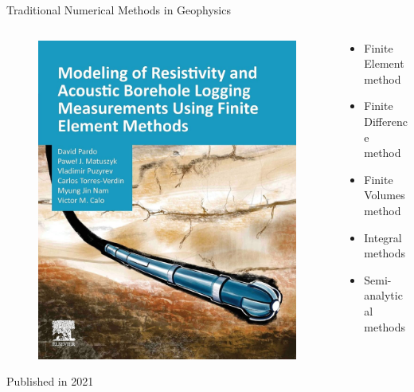 \begin{frame}{Traditional Numerical Methods in Geophysics}
\begin{columns}
\begin{column}{0.5\textwidth}
	\begin{figure}
	\includegraphics[scale=0.13]{frames/JonAnder/Figures/PardoBook.jpg}
	\end{figure}
	\hspace{0.9cm} {\small Published in 2021}
\end{column}
%
\begin{column}{0.5\textwidth}
\begin{itemize}
\item Finite Element method
\vspace{0.4cm}
\item Finite Difference method
\vspace{0.4cm}
\item Finite Volumes method
\vspace{0.4cm}
\item Integral methods
\vspace{0.4cm}
\item Semi-analytical methods
\end{itemize}
\end{column}
\end{columns}
\end{frame}

